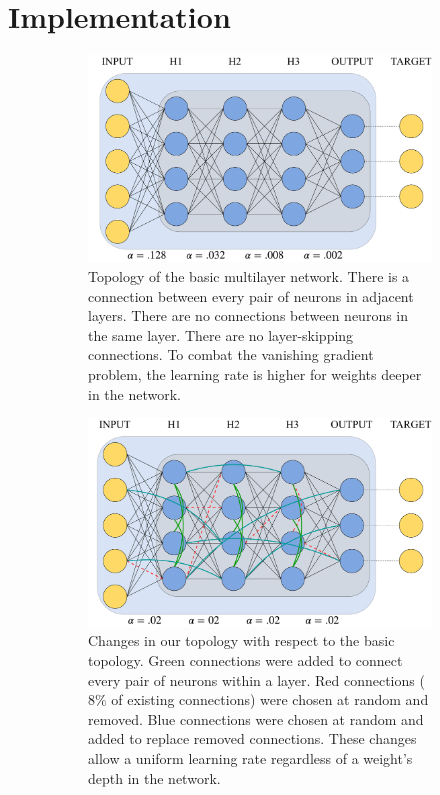 \documentclass{article}
\begin{document}
\section{Implementation}

\begin{figure}
  \centering
  \begin{subfigure}[t]{.48\textwidth}
    \includegraphics[width=.9\textwidth]{figures/basic_topology_illustration.pdf}
    \caption{Topology of the basic multilayer network. There is a connection between every pair of neurons in adjacent layers. There are no connections between neurons in the same layer. There are no layer-skipping connections. To combat the vanishing gradient problem, the learning rate is higher for weights deeper in the network.}
    \label{fig:top_basic}
  \end{subfigure}
  \hfill
  \begin{subfigure}[t]{.48\textwidth}
    \includegraphics[width=.9\textwidth]{figures/topology_changes_illustration.pdf}
    \caption{Changes in our topology with respect to the basic topology. Green connections were added to connect every pair of neurons within a layer. Red connections ($8\%$ of existing connections) were chosen at random and removed. Blue connections were chosen at random and added to replace removed connections. These changes allow a uniform learning rate regardless of a weight's depth in the network.}
    \label{fig:top_sw}
  \end{subfigure}
  \caption{}
  \label{fig:topology_illus}
\end{figure}
\end{document}

